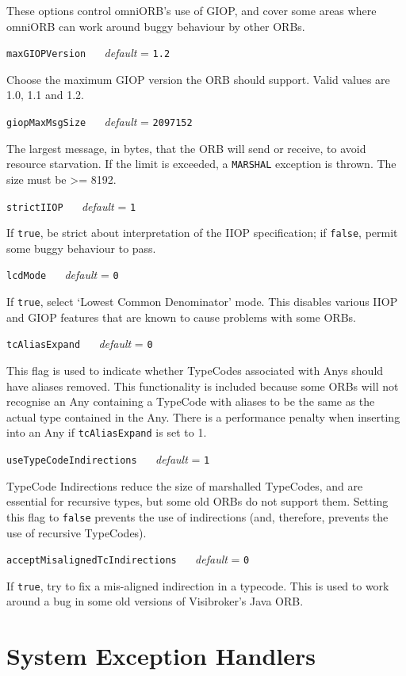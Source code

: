 \documentclass[11pt,oneside,a4paper]{book}
\makeatletter
\newcommand{\code}[1]{\texttt{#1}}
\newcommand{\confopt}[2]
  {\vspace{\baselineskip}\par\noindent\code{#1} ~~ \textit{default} =
   \code{#2}}
\renewcommand{\confopt}[2]
  {\vspace{\baselineskip}\par\noindent\code{#1} ~~ \textit{default} =
   \code{#2}\\[-1ex]\@afterheading}
\makeatother
\begin{document}
These options control omniORB's use of GIOP, and cover some areas
where omniORB can work around buggy behaviour by other ORBs.


\confopt{maxGIOPVersion}{1.2}

Choose the maximum GIOP version the ORB should support. Valid values
are 1.0, 1.1 and 1.2.


\confopt{giopMaxMsgSize}{2097152}

The largest message, in bytes, that the ORB will send or receive, to
avoid resource starvation. If the limit is exceeded, a \code{MARSHAL}
exception is thrown. The size must be >= 8192.

\confopt{strictIIOP}{1}

If \code{true}, be strict about interpretation of the IIOP
specification; if \code{false}, permit some buggy behaviour to pass.


\confopt{lcdMode}{0}

If \code{true}, select `Lowest Common Denominator' mode. This disables
various IIOP and GIOP features that are known to cause problems with
some ORBs.


\confopt{tcAliasExpand}{0}

This flag is used to indicate whether TypeCodes associated with Anys
should have aliases removed. This functionality is included because
some ORBs will not recognise an Any containing a TypeCode with aliases
to be the same as the actual type contained in the Any. There is a
performance penalty when inserting into an Any if \code{tcAliasExpand}
is set to 1.


\confopt{useTypeCodeIndirections}{1}

TypeCode Indirections reduce the size of marshalled TypeCodes, and are
essential for recursive types, but some old ORBs do not support them.
Setting this flag to \code{false} prevents the use of indirections
(and, therefore, prevents the use of recursive TypeCodes).


\confopt{acceptMisalignedTcIndirections}{0}

If \code{true}, try to fix a mis-aligned indirection in a
typecode. This is used to work around a bug in some old versions of
Visibroker's Java ORB.


\vspace{2\baselineskip}


\section{System Exception Handlers}
\label{sec:exHandlers}
\end{document}
